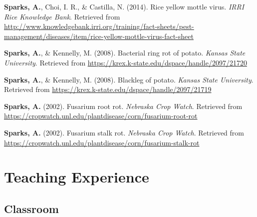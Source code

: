 \documentclass[11pt, a4paper]{awesome-cv}
\begin{document}
\leavevmode{}%
\textbf{Sparks, A.}, Choi, I. R., \& Castilla, N. (2014). Rice yellow
mottle virus. \emph{{IRRI} Rice Knowledge Bank}. Retrieved from
\url{http://www.knowledgebank.irri.org/training/fact-sheets/pest-management/diseases/item/rice-yellow-mottle-virus-fact-sheet}

\leavevmode{}%
\textbf{Sparks, A.}, \& Kennelly, M. (2008). Bacterial ring rot of
potato. \emph{Kansas State University}. Retrieved from
\url{https://krex.k-state.edu/dspace/handle/2097/21720}

\leavevmode{}%
\textbf{Sparks, A.}, \& Kennelly, M. (2008). Blackleg of potato.
\emph{Kansas State University}. Retrieved from
\url{https://krex.k-state.edu/dspace/handle/2097/21719}

\leavevmode{}%
\textbf{Sparks, A.} (2002). Fusarium root rot. \emph{Nebraska Crop
Watch}. Retrieved from
\url{https://cropwatch.unl.edu/plantdisease/corn/fusarium-root-rot}

\leavevmode{}%
\textbf{Sparks, A.} (2002). Fusarium stalk rot. \emph{Nebraska Crop
Watch}. Retrieved from
\url{https://cropwatch.unl.edu/plantdisease/corn/fusarium-stalk-rot}

\endgroup

\hypertarget{teaching-experience}{%
\section{Teaching Experience}\label{teaching-experience}}

\hypertarget{classroom}{%
\subsection{Classroom}\label{classroom}}

\begin{cventries}
\end{cventries}
\end{document}
